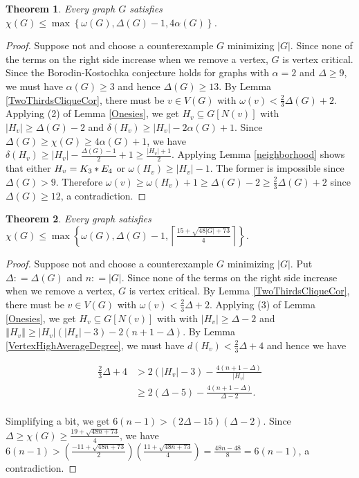 \documentclass[12pt]{article}
\theoremstyle{plain}
\newtheorem{thm}{Theorem}[section]
\theoremstyle{definition}
\theoremstyle{remark}
\newcommand{\set}[1]{\left\{ #1 \right\}}
\newcommand{\card}[1]{\left|#1\right|}
\newcommand{\size}[1]{\left\Vert#1\right\Vert}
\newcommand{\ceil}[1]{\left\lceil#1\right\rceil}
\newcommand{\join}[2]{#1 \mbox{\hspace{2 pt}$\ast$\hspace{2 pt}} #2}
\newcommand{\parens}[1]{\left( #1 \right)}
\newcommand{\DefinedAs}{\mathrel{\mathop:}=}
\begin{document}
\begin{thm}\label{AlphaBound}
Every graph $G$ satisfies $\chi(G) \leq \max\set{\omega(G), \Delta(G) - 1, 4\alpha(G)}$.
\end{thm}
\begin{proof}
Suppose not and choose a counterexample $G$ minimizing $\card{G}$.  Since none of the terms on the right side increase when we remove a vertex, $G$ is vertex critical.  Since the Borodin-Kostochka conjecture holds for graphs with $\alpha = 2$ and $\Delta \geq 9$, we must have $\alpha(G) \geq 3$ and hence $\Delta(G) \geq 13$.  By Lemma \ref{TwoThirdsCliqueCor}, there must be $v \in V(G)$ with $\omega(v) < \frac23 \Delta(G) + 2$.  Applying (2) of Lemma \ref{Onesies}, we get $H_v \subseteq G[N(v)]$ with $\card{H_v} \geq \Delta(G) - 2$ and $\delta(H_v) \geq \card{H_v} - 2\alpha(G) + 1$.  Since $\Delta(G) \geq \chi(G) \geq 4\alpha(G) + 1$, we have $\delta(H_v) \geq \card{H_v} - \frac{\Delta(G) - 1}{2} + 1 \geq \frac{\card{H_v} + 1}{2}$.  Applying Lemma \ref{neighborhood} shows that either $H_v = \join{K_3}{E_4}$ or $\omega(H_v) \geq \card{H_v} - 1$.  The former is impossible since $\Delta(G) > 9$. Therefore $\omega(v) \geq \omega(H_v) + 1 \geq \Delta(G) - 2 \geq \frac23 \Delta(G) + 2$ since $\Delta(G) \geq 12$, a contradiction.
\end{proof}

\begin{thm}\label{OrderBound}
Every graph satisfies $\chi(G) \leq \max\set{\omega(G), \Delta(G) - 1, \ceil{\frac{15 + \sqrt{48|G| + 73}}{4}}}$.
\end{thm}
\begin{proof}
Suppose not and choose a counterexample $G$ minimizing $\card{G}$.  Put $\Delta \DefinedAs \Delta(G)$ and $n \DefinedAs \card{G}$. Since none of the terms on the right side increase when we remove a vertex, $G$ is vertex critical. By Lemma \ref{TwoThirdsCliqueCor}, there must be $v \in V(G)$ with $\omega(v) < \frac23 \Delta + 2$.  Applying (3) of Lemma \ref{Onesies}, we get $H_v \subseteq G[N(v)]$ with with $\card{H_v} \geq \Delta - 2$ and $\size{H_v} \geq \card{H_v}\parens{\card{H_v}- 3} - 2\parens{n + 1 - \Delta}$.  By Lemma \ref{VertexHighAverageDegree}, we must have $d(H_v) < \frac23\Delta + 4$ and hence we have

\begin{align*}
\frac23\Delta + 4 &> 2\parens{\card{H_v}- 3} - \frac{4\parens{n + 1 - \Delta}}{\card{H_v}}\\
&\geq 2\parens{\Delta - 5} - \frac{4\parens{n + 1 - \Delta}}{\Delta - 2}.\\
\end{align*}

Simplifying a bit, we get $6(n-1) > (2\Delta - 15)(\Delta - 2)$.  Since $\Delta \geq \chi(G) \geq \frac{19 + \sqrt{48n + 73}}{4}$, we have $6(n-1) > (\frac{-11 + \sqrt{48n + 73}}{2})(\frac{11 + \sqrt{48n + 73}}{4}) = \frac{48n - 48}{8} = 6(n-1)$, a contradiction.
\end{proof}
\end{document}
